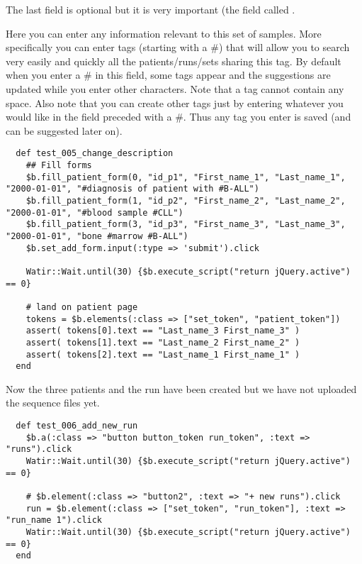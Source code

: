 The last field is optional but it is very important (the field called
.

Here you can enter any information relevant to this set of samples.
More specifically you can enter tags (starting with a \#) that will allow
you to search very easily and quickly all the patients/runs/sets sharing
this tag.
By default when you enter a \# in this field, some tags appear and the
suggestions are  updated while you enter other characters.
Note that a tag cannot contain any space.
Also note that you can create other tags just by entering whatever you would
like in the field preceded with a \#. Thus any tag you enter is saved (and
can be suggested later on).

\begin{verbatim}
  def test_005_change_description
    ## Fill forms
    $b.fill_patient_form(0, "id_p1", "First_name_1", "Last_name_1", "2000-01-01", "#diagnosis of patient with #B-ALL")
    $b.fill_patient_form(1, "id_p2", "First_name_2", "Last_name_2", "2000-01-01", "#blood sample #CLL")
    $b.fill_patient_form(3, "id_p3", "First_name_3", "Last_name_3", "2000-01-01", "bone #marrow #B-ALL")
    $b.set_add_form.input(:type => 'submit').click

    Watir::Wait.until(30) {$b.execute_script("return jQuery.active") == 0}

    # land on patient page
    tokens = $b.elements(:class => ["set_token", "patient_token"])
    assert( tokens[0].text == "Last_name_3 First_name_3" )
    assert( tokens[1].text == "Last_name_2 First_name_2" )
    assert( tokens[2].text == "Last_name_1 First_name_1" )
  end

\end{verbatim}


Now the three patients and the run have been created but we have not uploaded
the sequence files yet.

\begin{verbatim}
  def test_006_add_new_run
    $b.a(:class => "button button_token run_token", :text => "runs").click
    Watir::Wait.until(30) {$b.execute_script("return jQuery.active") == 0}

    # $b.element(:class => "button2", :text => "+ new runs").click
    run = $b.element(:class => ["set_token", "run_token"], :text => "run_name 1").click
    Watir::Wait.until(30) {$b.execute_script("return jQuery.active") == 0}
  end

\end{verbatim}

